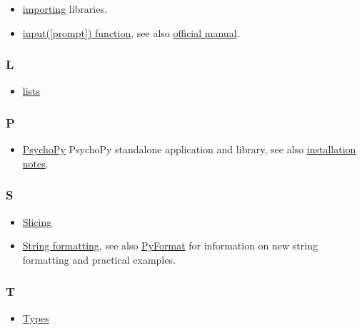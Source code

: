 \documentclass[
]{book}
\providecommand{\tightlist}{%
  \setlength{\itemsep}{0pt}\setlength{\parskip}{0pt}}
\begin{document}
\begin{itemize}
\tightlist
\item
  \protect\hyperlink{import}{importing} libraries.
\item
  \protect\hyperlink{input-function}{input({[}prompt{]}) function}, see also \href{https://docs.python.org/3/library/functions.html\#input}{official manual}.
\end{itemize}

\hypertarget{l}{%
\subsubsection*{L}\label{l}}

\begin{itemize}
\tightlist
\item
  \protect\hyperlink{lists}{lists}
\end{itemize}

\hypertarget{p}{%
\subsubsection*{P}\label{p}}

\begin{itemize}
\tightlist
\item
  \href{https://www.psychopy.org/}{PsychoPy} PsychoPy standalone application and library, see also \protect\hyperlink{install-psychopy}{installation notes}.
\end{itemize}

\hypertarget{s}{%
\subsubsection*{S}\label{s}}

\begin{itemize}
\tightlist
\item
  \protect\hyperlink{lists}{Slicing}
\item
  \protect\hyperlink{string-formatting}{String formatting}, see also \href{https://pyformat.info/}{PyFormat} for information on new string formatting and practical examples.
\end{itemize}

\hypertarget{t}{%
\subsubsection*{T}\label{t}}

\begin{itemize}
\tightlist
\item
  \protect\hyperlink{value-types}{Types}
\end{itemize}
\end{document}
